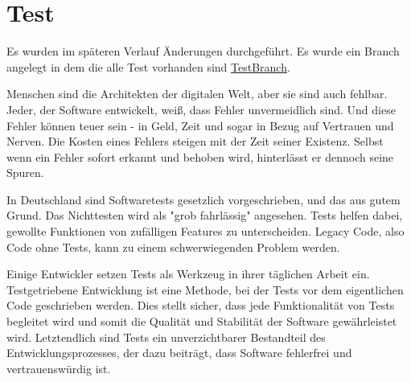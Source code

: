 \chapter{Test}

Es wurden im späteren Verlauf Änderungen durchgeführt. Es wurde ein Branch angelegt in dem die alle Test vorhanden sind \href{https://github.com/lorenz1702/Spy-Game/tree/UnitTestBranch}{TestBranch}.

Menschen sind die Architekten der digitalen Welt, aber sie sind auch fehlbar. Jeder, der Software entwickelt, weiß, dass Fehler unvermeidlich sind. Und diese Fehler können teuer sein - in Geld, Zeit und sogar in Bezug auf Vertrauen und Nerven. Die Kosten eines Fehlers steigen mit der Zeit seiner Existenz. Selbst wenn ein Fehler sofort erkannt und behoben wird, hinterlässt er dennoch seine Spuren.

In Deutschland sind Softwaretests gesetzlich vorgeschrieben, und das aus gutem Grund. Das Nichttesten wird als "grob fahrlässig" angesehen. Tests helfen dabei, gewollte Funktionen von zufälligen Features zu unterscheiden. Legacy Code, also Code ohne Tests, kann zu einem schwerwiegenden Problem werden.

Einige Entwickler setzen Tests als Werkzeug in ihrer täglichen Arbeit ein. Testgetriebene Entwicklung ist eine Methode, bei der Tests vor dem eigentlichen Code geschrieben werden. Dies stellt sicher, dass jede Funktionalität von Tests begleitet wird und somit die Qualität und Stabilität der Software gewährleistet wird. Letztendlich sind Tests ein unverzichtbarer Bestandteil des Entwicklungsprozesses, der dazu beiträgt, dass Software fehlerfrei und vertrauenswürdig ist.

